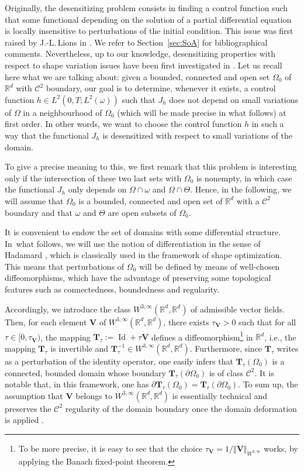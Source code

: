\documentclass[11pt]{article}
\newcommand{\ie}{i.e.,\xspace}
\numberwithin{equation}{section}
\newcommand{\bT}{\boldsymbol{T}}
\newcommand{\bV}{\boldsymbol{V}}
\DeclareMathOperator{\Id}{Id}
\newcommand\R{{\mathbb R}}
\theoremstyle{definition}
\begin{document}
Originally, the desensitizing problem consists in finding a control function such that some functional depending on the solution of a partial differential equation is locally {insensitive} to perturbations of the initial condition. This issue was first raised by J.\nobreakdash-L.\,Lions in \cite{Lions-1990}. We refer to Section~\ref{sec:SoA} for bibliographical comments. Nevertheless, up to our knowledge, desensitizing properties with respect to shape variation issues have been first investigated in \cite{Lissy-Privat-Simpore}. Let us recall here what we are talking about: given a bounded, connected and open set $\Omega_0$ of $\R^d$ with $\mathscr{C}^2$ boundary, our goal is to determine, whenever it exists, a control function $h \in L^2(0,T;L^2(\omega))$ such that $J_h$ does not depend on small variations of $\Omega$ in a neighbourhood of $\Omega_0$ (which will be made precise in what follows) at first order. In other words, we want to choose the control function $h$ in such a way that the functional $J_h$ is desensitized with respect to small variations of the domain.

To give a precise meaning to this, we first remark that this problem is interesting only if the intersection of these two last sets with $\Omega_0$ is nonempty, in which case the functional $J_h$ only depends on $\Omega\cap\omega$ and $\Omega\cap\Theta$. Hence, in the following, we will assume that $\Omega_0$ is a bounded, connected and open set of $\R^d$ with a $\mathscr{C}^2$ boundary and that $\omega$ and $\Theta$ are open subsets of $\Omega_{0}$.

It is convenient to endow the set of domains with some differential structure. In~what follows, we will use the notion of differentiation in the sense of Hadamard \cite{Delfour-Zolesio,Henrot-Pierre-2005}, which is classically used in the framework of shape optimization. This means that perturbations of $\Omega_0$ will be defined by means of well-chosen diffeomorphisms, which have the advantage of preserving some topological features such as connectedness, boundedness and regularity.

Accordingly, we introduce the class $W^{3, \infty}(\R^d, \R^d)$ of admissible vector fields. Then, for each element $\bV$ of $W^{3,\infty}(\R^d, \R^d)$, there exists $\tau_{\bV}>0$ such that for all $\tau\in [0,\tau_{\bV})$, the mapping $\bT_\tau:=\Id+\tau\bV$ defines a diffeomorphism\footnote{To be more precise, it is easy to see that the choice $\tau_{\bV}=1/\Vert \bV\Vert_{W^{3,\infty}}$ works, by applying the Banach fixed-point theorem.} in $\R^d$, \ie the mapping $\bT_\tau$ is invertible and $\bT_\tau^{-1}\in W^{3,\infty}(\R^d,\R^d)$.
Furthermore, since $\bT_\tau$ writes as a perturbation of the identity operator, one easily infers that $\bT_\tau(\Omega_0)$ is a connected, bounded domain whose boundary $\bT_\tau(\partial \Omega_0)$ is of class $\mathscr{C}^2$. It is notable that, in this framework, one has $\partial \bT_\tau(\Omega_0)=\bT_\tau(\partial \Omega_0)$. To sum up, the assumption that $\bV$ belongs to $W^{3,\infty}(\R^d, \R^d)$ is essentially technical and preserves the $\mathscr{C}^2$ regularity of the domain boundary once the domain deformation is applied \cite[Chap.\,7]{Delfour-Zolesio}.
\end{document}
